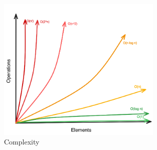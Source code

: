 \begin{center}
    \begin{figure}[H]
        \centering
        \includegraphics[width=0.7\textwidth]{assets/complexity.png}
        \caption{Complexity}
    \end{figure}
\end{center}

